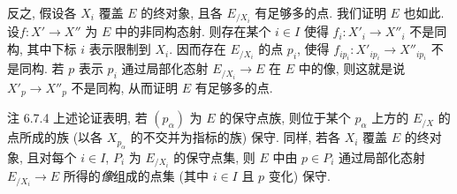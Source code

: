 反之, 假设各 $X_i$ 覆盖 $E$ 的终对象, 且各 $E_{/X_i}$ 有足够多的点. 我们证明 $E$ 也如此. 设\pageoriginale $f:X'\rightarrow X''$ 为 $E$ 中的非同构态射. 则存在某个 $i\in I$ 使得 $f_i:X'_i\rightarrow X''_i$ 不是同构, 其中下标 $i$ 表示限制到 $X_i$. 因而存在 $E_{/X_i}$ 的点 $p_i$, 使得 $f_{ip_i}:X'_{ip_i}\rightarrow X''_{ip_i}$ 不是同构. 若 $p$ 表示 $p_i$ 通过局部化态射 $E_{/X_i}\rightarrow E$ 在 $E$ 中的像, 则这就是说 $X'_p\rightarrow X''_p$ 不是同构, 从而证明 $E$ 有足够多的点.

\begin{enonce*}[remark]{注 6.7.4}
上述论证表明, 若 $(p_{\alpha})$ 为 $E$ 的保守点族, 则位于某个 $p_{\alpha}$ 上方的 $E_{/X}$ 的点所成的族 (以各 $X_{p_{\alpha}}$ 的不交并为指标的族) 保守. 同样, 若各 $X_i$ 覆盖 $E$ 的终对象, 且对每个 $i\in I$, $P_i$ 为 $E_{/X_i}$ 的保守点集, 则 $E$ 中由 $p\in P_i$ 通过局部化态射 $E_{/X_i}\rightarrow E$ 所得的\emph{像}组成的点集 (其中 $i\in I$ 且 $p$ 变化) 保守.
\end{enonce*}

\setcounter{subsection}{7}



